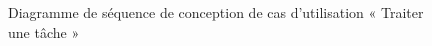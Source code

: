 \begin{figure}[H]
  \centering
  \caption{Diagramme de séquence de conception de cas d'utilisation « Traiter une tâche »}
  \label{fig:sequence_conception_traiterTask}
\end{figure}

